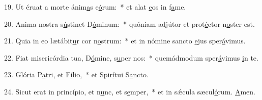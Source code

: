 19. Ut éruat a morte ánim\uline{a}s e\uline{ó}rum:~* et alat \uline{e}os in f\uline{a}me.\par 
20. Anima nostra s\uline{ú}stinet D\uline{ó}minum:~* quóniam adjútor et prot\uline{é}ctor n\uline{o}ster est.\par 
21. Quia in eo lætábit\uline{u}r cor n\uline{o}strum:~* et in nómine sancto \uline{e}jus sper\uline{á}vimus.\par 
22. Fiat misericórdia tua, D\uline{ó}mine, s\uline{u}per nos:~* quemádmodum sper\uline{á}vimus \uline{i}n te.\par 
23. Glória P\uline{a}tri, et F\uline{í}lio,~* et Spir\uline{í}tui S\uline{a}ncto.\par 
24. Sicut erat in princípio, et n\uline{u}nc, et s\uline{e}mper,~* et in sǽcula sæcul\uline{ó}rum. \uline{A}men.\par 
